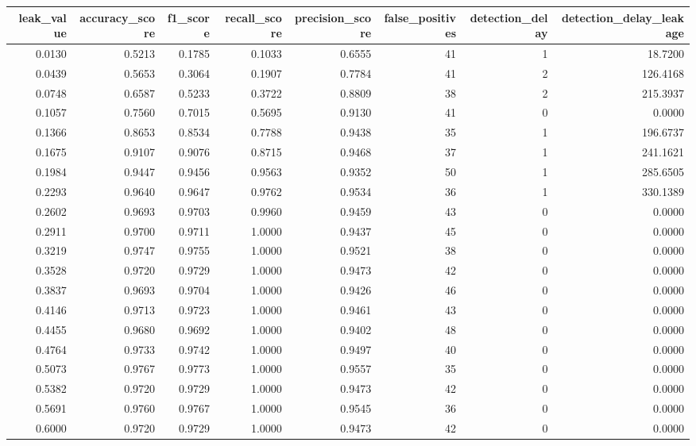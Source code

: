 \begin{tabular}{rrrrrrrr}
\toprule
leak\_value & accuracy\_score & f1\_score & recall\_score & precision\_score & false\_positives & detection\_delay & detection\_delay\_leakage \\
\midrule
0.0130 & 0.5213 & 0.1785 & 0.1033 & 0.6555 & 41 & 1 & 18.7200 \\
0.0439 & 0.5653 & 0.3064 & 0.1907 & 0.7784 & 41 & 2 & 126.4168 \\
0.0748 & 0.6587 & 0.5233 & 0.3722 & 0.8809 & 38 & 2 & 215.3937 \\
0.1057 & 0.7560 & 0.7015 & 0.5695 & 0.9130 & 41 & 0 & 0.0000 \\
0.1366 & 0.8653 & 0.8534 & 0.7788 & 0.9438 & 35 & 1 & 196.6737 \\
0.1675 & 0.9107 & 0.9076 & 0.8715 & 0.9468 & 37 & 1 & 241.1621 \\
0.1984 & 0.9447 & 0.9456 & 0.9563 & 0.9352 & 50 & 1 & 285.6505 \\
0.2293 & 0.9640 & 0.9647 & 0.9762 & 0.9534 & 36 & 1 & 330.1389 \\
0.2602 & 0.9693 & 0.9703 & 0.9960 & 0.9459 & 43 & 0 & 0.0000 \\
0.2911 & 0.9700 & 0.9711 & 1.0000 & 0.9437 & 45 & 0 & 0.0000 \\
0.3219 & 0.9747 & 0.9755 & 1.0000 & 0.9521 & 38 & 0 & 0.0000 \\
0.3528 & 0.9720 & 0.9729 & 1.0000 & 0.9473 & 42 & 0 & 0.0000 \\
0.3837 & 0.9693 & 0.9704 & 1.0000 & 0.9426 & 46 & 0 & 0.0000 \\
0.4146 & 0.9713 & 0.9723 & 1.0000 & 0.9461 & 43 & 0 & 0.0000 \\
0.4455 & 0.9680 & 0.9692 & 1.0000 & 0.9402 & 48 & 0 & 0.0000 \\
0.4764 & 0.9733 & 0.9742 & 1.0000 & 0.9497 & 40 & 0 & 0.0000 \\
0.5073 & 0.9767 & 0.9773 & 1.0000 & 0.9557 & 35 & 0 & 0.0000 \\
0.5382 & 0.9720 & 0.9729 & 1.0000 & 0.9473 & 42 & 0 & 0.0000 \\
0.5691 & 0.9760 & 0.9767 & 1.0000 & 0.9545 & 36 & 0 & 0.0000 \\
0.6000 & 0.9720 & 0.9729 & 1.0000 & 0.9473 & 42 & 0 & 0.0000 \\
\bottomrule
\end{tabular}
